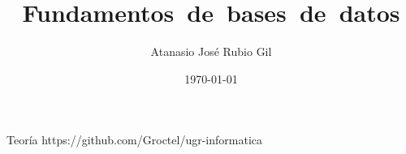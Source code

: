 \documentclass[10pt]{report}
\author{Atanasio José Rubio Gil}
\title{Fundamentos~de~bases~de~datos}
\date{\today}
\begin{document}
            {Teoría}
            {https://github.com/Groctel/ugr-informatica}
\tableofcontents

 \pagebreak
 \pagebreak

\end{document}
